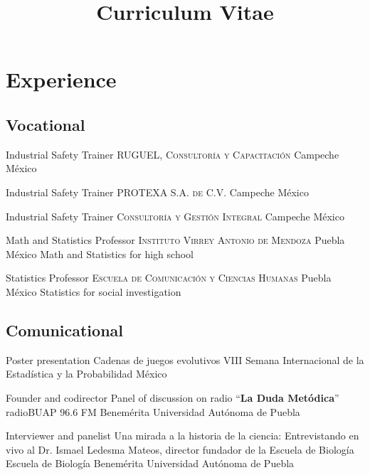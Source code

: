 \documentclass[10pt, letterpaper, roman]{moderncv}
\title{Curriculum Vitae}
\begin{document}
\makecvtitle


\section{Experience}

\subsection{Vocational}

		{Industrial Safety Trainer}
		{\newline \textsc{RUGUEL, Consultoría y Capacitación}}
		{Campeche}
		{México}
		{}

		{Industrial Safety Trainer}
		{\newline \textsc{PROTEXA S.A. de C.V.}}
		{Campeche}
		{México}
		{}
		
		{Industrial Safety Trainer}
		{\newline \textsc{Consultoría y Gestión Integral}}
		{Campeche}
		{México}
		{}
		
		{Math and Statistics Professor}
		{\newline \textsc{Instituto Virrey Antonio de Mendoza}}
		{Puebla}
		{México}
		{Math and Statistics for high school}

		{Statistics Professor}
		{\newline \textsc{Escuela de Comunicación y Ciencias Humanas}}
		{Puebla}
		{México}
		{Statistics for social investigation}

\subsection{Comunicational}

		{Poster presentation}
		{Cadenas de juegos evolutivos}
		{VIII Semana Internacional de la Estadística y la Probabilidad}
		{}
		{México}

		{Founder and codirector}
		{Panel of discussion on radio ``\textbf{La Duda Metódica}''}
		{}
		{\newline radioBUAP 96.6 FM}
		{Benemérita Universidad Autónoma de Puebla}

		{Interviewer and panelist}
		{Una mirada a la historia de la ciencia: Entrevistando en vivo al Dr. 
		Ismael Ledesma Mateos, director fundador de la Escuela de Biología}
		{}
		{\newline Escuela de Biología}
		{Benemérita Universidad Autónoma de Puebla}
\end{document}
